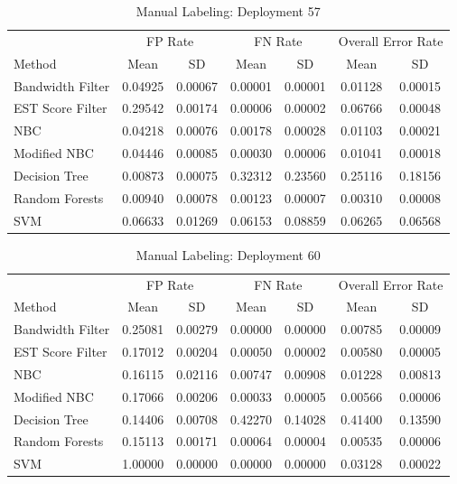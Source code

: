 \documentclass[twoside]{article}
\begin{document}
\begin{table}[H]
\caption{Manual Labeling: Deployment 57}
\centering
\begin{tabular}{lcccccc}
\toprule
\multicolumn{1}{c}{ } 
&\multicolumn{2}{c}{FP Rate } 
&\multicolumn{2}{c}{FN Rate } 
&\multicolumn{2}{c}{Overall Error Rate } \\
\cmidrule(r){2-3}
\cmidrule(r){4-5}
\cmidrule(r){6-7}
Method& Mean & SD & Mean & SD & Mean & SD \\
\midrule
Bandwidth Filter & 0.04925 & 0.00067 & 0.00001 & 0.00001 & 0.01128 & 0.00015 \\
EST Score Filter & 0.29542 & 0.00174 & 0.00006 & 0.00002 & 0.06766 & 0.00048 \\
NBC & 0.04218 & 0.00076 & 0.00178 & 0.00028 & 0.01103 & 0.00021 \\
Modified NBC  & 0.04446 & 0.00085 & 0.00030 & 0.00006 & 0.01041 & 0.00018 \\
Decision Tree & 0.00873 & 0.00075 & 0.32312 & 0.23560 & 0.25116 & 0.18156 \\
Random Forests & 0.00940 & 0.00078 & 0.00123 & 0.00007 & 0.00310 & 0.00008 \\
SVM & 0.06633 & 0.01269 & 0.06153 & 0.08859 & 0.06265 & 0.06568 \\
\bottomrule
\end{tabular}
\end{table}

\begin{table}[H]
\caption{Manual Labeling: Deployment 60}
\centering
\begin{tabular}{lcccccc}
\toprule
\multicolumn{1}{c}{ } 
&\multicolumn{2}{c}{FP Rate } 
&\multicolumn{2}{c}{FN Rate } 
&\multicolumn{2}{c}{Overall Error Rate } \\
\cmidrule(r){2-3}
\cmidrule(r){4-5}
\cmidrule(r){6-7}
Method& Mean & SD & Mean & SD & Mean & SD \\
\midrule
Bandwidth Filter & 0.25081 & 0.00279 & 0.00000 & 0.00000 & 0.00785 & 0.00009 \\
EST Score Filter & 0.17012 & 0.00204 & 0.00050 & 0.00002 & 0.00580 & 0.00005 \\
NBC & 0.16115 & 0.02116 & 0.00747 & 0.00908 & 0.01228 & 0.00813 \\
Modified NBC & 0.17066 & 0.00206 & 0.00033 & 0.00005 & 0.00566 & 0.00006 \\
Decision Tree & 0.14406 & 0.00708 & 0.42270 & 0.14028 & 0.41400 & 0.13590 \\
Random Forests & 0.15113 & 0.00171 & 0.00064 & 0.00004 & 0.00535 & 0.00006 \\
SVM & 1.00000 & 0.00000 & 0.00000 & 0.00000 & 0.03128 & 0.00022 \\
\bottomrule
\end{tabular}
\end{table}
\end{document}
